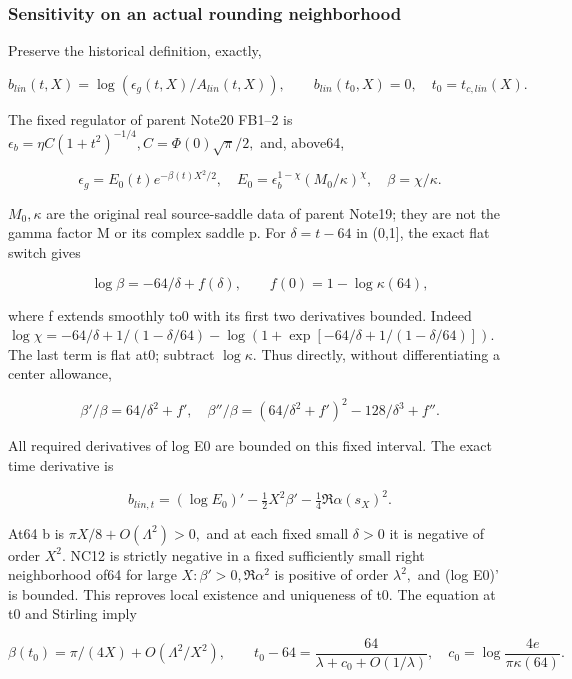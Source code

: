 \subsubsection{Sensitivity on an actual rounding neighborhood}
\label{subsec:nc-3}

Preserve the historical definition, exactly,

\[
b_{lin}(t,X)=\log(\epsilon_g(t,X)/A_{lin}(t,X)),\qquad
b_{lin}(t_0,X)=0,\quad t_0=t_{c,lin}(X).
\tag{NC8}\label{eq:ansatz-nc8}
\]

The fixed regulator of parent Note20 FB1--2 is \(\epsilon_{b}=\eta C(1+t^{2})^{-1/4}, C=\Phi(0)\sqrt{\pi}/2,\) and, above64,

\[
\epsilon_g=E_0(t)e^{-\beta(t)X^2/2},\quad
E_0=\epsilon_b^{1-\chi}(M_0/\kappa)^\chi,
\quad\beta=\chi/\kappa.
\tag{NC9}\label{eq:ansatz-nc9}
\]

\(M_{0},\kappa\) are the original real source-saddle data of parent Note19; they are not the gamma factor M or its complex saddle p. For \(\delta=t-64\) in (0,1], the exact flat switch gives

\[
\log\beta=-64/\delta+f(\delta),\qquad
f(0)=1-\log\kappa(64),
\tag{NC10}\label{eq:ansatz-nc10}
\]

where f extends smoothly to0 with its first two derivatives bounded. Indeed \(\log \chi=-64/\delta+1/(1-\delta/64) -\log(1+\exp[-64/\delta+1/(1-\delta/64)]).\) The last term is flat at0; subtract \(\log \kappa.\) Thus directly, without differentiating a center allowance,

\[
\beta'/\beta=64/\delta^2+f',\quad
\beta''/\beta=(64/\delta^2+f')^2-128/\delta^3+f''.
\tag{NC11}\label{eq:ansatz-nc11}
\]

All required derivatives of log E0 are bounded on this fixed interval. The exact time derivative is

\[
b_{lin,t}=(\log E_0)'-\tfrac12 X^2\beta'
                          -\tfrac14\Re\alpha(s_X)^2.
\tag{NC12}\label{eq:ansatz-nc12}
\]

At64 b is \(\pi X/8+O(\Lambda^{2})>0,\) and at each fixed small \(\delta>0\) it is negative of order \(X^{2}.\) NC12 is strictly negative in a fixed sufficiently small right neighborhood of64 for large \(X: \beta'>0, \Re \alpha^{2}\) is positive of order \(\lambda^{2},\) and (log E0)' is bounded. This reproves local existence and uniqueness of t0. The equation at t0 and Stirling imply

\[
\beta(t_0)=\pi/(4X)+O(\Lambda^2/X^2),\qquad
t_0-64=\frac{64}{\lambda+c_0+O(1/\lambda)},\quad
c_0=\log\frac{4e}{\pi\kappa(64)}.
\tag{NC13}\label{eq:ansatz-nc13}
\]

